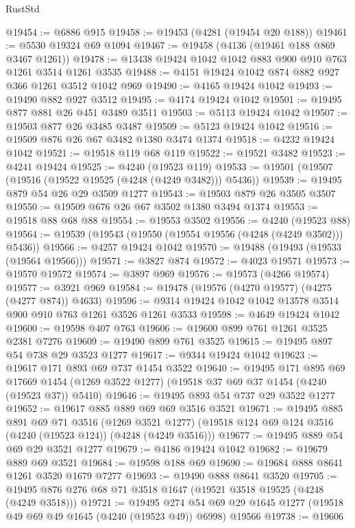 \begin{lexlean}{RustStd}
\begin{coremodule}
@19454 := @6886 @915
@19458 := @19453 (@4281 (@19454 @20 @188))
@19461 := @5530 @19324 @69 @1094
@19467 := @19458 (@4136 (@19461 @188 @869 @3467 @1261))
@19478 := @13438 @19424 @1042 @1042 @883 @900 @910 @763 @1261 @3514 @1261 @3535
@19488 := @4151 @19424 @1042 @874 @882 @927 @366 @1261 @3512 @1042 @969
@19490 := @4165 @19424 @1042
@19493 := @19490 @882 @927 @3512
@19495 := @4174 @19424 @1042
@19501 := @19495 @877 @881 @26 @451 @3489 @3511
@19503 := @5113 @19424 @1042
@19507 := @19503 @877 @26 @3485 @3487
@19509 := @5123 @19424 @1042
@19516 := @19509 @876 @26 @67 @3482 @1380 @3474 @1374
@19518 := @4232 @19424 @1042
@19521 := @19518 @119 @68 @119
@19522 := @19521 @3482
@19523 := @4241 @19424
@19525 := @4240 (@19523 @119)
@19533 := @19501 (@19507 (@19516 (@19522 @19525 (@4248 (@4249 @3482))) @5436))
@19539 := @19495 @879 @54 @26 @29 @3509 @1277
@19543 := @19503 @879 @26 @3505 @3507
@19550 := @19509 @676 @26 @67 @3502 @1380 @3494 @1374
@19553 := @19518 @88 @68 @88
@19554 := @19553 @3502
@19556 := @4240 (@19523 @88)
@19564 := @19539 (@19543 (@19550 (@19554 @19556 (@4248 (@4249 @3502))) @5436))
@19566 := @4257 @19424 @1042
@19570 := @19488 (@19493 (@19533 (@19564 @19566)))
@19571 := @3827 @874
@19572 := @4023 @19571
@19573 := @19570 @19572
@19574 := @3897 @969
@19576 := @19573 (@4266 @19574)
@19577 := @3921 @969
@19584 := @19478 (@19576 (@4270 @19577) (@4275 (@4277 @874)) @4633)
@19596 := @9314 @19424 @1042 @1042 @13578 @3514 @900 @910 @763 @1261 @3526 @1261 @3533
@19598 := @4649 @19424 @1042
@19600 := @19598 @407 @763
@19606 := @19600 @899 @761 @1261 @3525 @2381 @7276
@19609 := @19490 @899 @761 @3525
@19615 := @19495 @897 @54 @738 @29 @3523 @1277
@19617 := @9344 @19424 @1042
@19623 := @19617 @171 @893 @69 @737 @1454 @3522
@19640 := @19495
    @171
    @895
    @69
    @17669
    @1454
    (@1269 @3522 @1277)
    (@19518 @37 @69 @37 @1454 (@4240 (@19523 @37)) @5410)
@19646 := @19495 @893 @54 @737 @29 @3522 @1277
@19652 := @19617 @885 @889 @69 @69 @3516 @3521
@19671 := @19495
    @885
    @891
    @69
    @71
    @3516
    (@1269 @3521 @1277)
    (@19518 @124 @69 @124 @3516 (@4240 (@19523 @124)) (@4248 (@4249 @3516)))
@19677 := @19495 @889 @54 @69 @29 @3521 @1277
@19679 := @4186 @19424 @1042
@19682 := @19679 @889 @69 @3521
@19684 := @19598 @188 @69
@19690 := @19684 @888 @8641 @1261 @3520 @1679 @7277
@19693 := @19490 @888 @8641 @3520
@19705 := @19495 @876 @276 @68 @71 @3518 @1647 (@19521 @3518 @19525 (@4248 (@4249 @3518)))
@19721 := @19495
    @274
    @54
    @69
    @29
    @1645
    @1277
    (@19518 @49 @69 @49 @1645 (@4240 (@19523 @49)) @6998)
    @19566
@19738 := @19606

\end{coremodule}
\end{lexlean}

